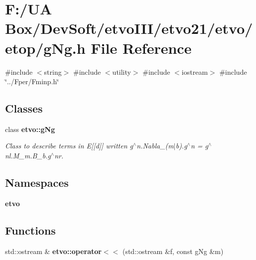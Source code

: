\section{F\+:/\+UA Box/\+Dev\+Soft/etvo\+I\+I\+I/etvo21/etvo/etop/g\+Ng.h File Reference}
\label{g_ng_8h}
{\ttfamily \#include $<$string$>$}\newline
{\ttfamily \#include $<$utility$>$}\newline
{\ttfamily \#include $<$iostream$>$}\newline
{\ttfamily \#include \char`\"{}../\+Fper/\+Fminp.\+h\char`\"{}}\newline
\subsection*{Classes}
\begin{DoxyCompactItemize}
\item 
class \textbf{ etvo\+::g\+Ng}
\begin{DoxyCompactList}\small\item\em Class to describe terms in E[[d]] written g$^\wedge$n.Nabla\+\_\+(m$\vert$b).g$^\wedge$n\textquotesingle{} = g$^\wedge$nl.M\+\_\+m.\+B\+\_\+b.\+g$^\wedge$nr. \end{DoxyCompactList}\end{DoxyCompactItemize}
\subsection*{Namespaces}
\begin{DoxyCompactItemize}
\item 
 \textbf{ etvo}
\end{DoxyCompactItemize}
\subsection*{Functions}
\begin{DoxyCompactItemize}
\item 
std\+::ostream \& \textbf{ etvo\+::operator$<$$<$} (std\+::ostream \&f, const g\+Ng \&m)
\end{DoxyCompactItemize}
